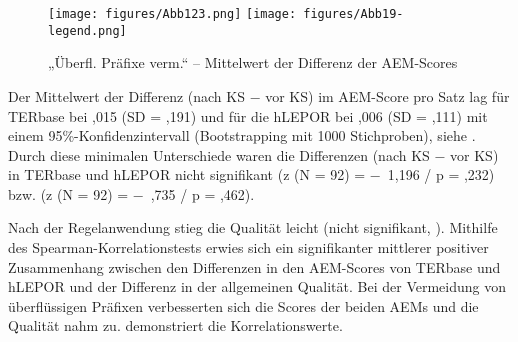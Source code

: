\begin{figure}






\texttt{[image: figures/Abb123.png]}
\texttt{[image: figures/Abb19-legend.png]}
\caption{\label{fig:05:123}„Überfl. Präfixe verm.“ -- Mittelwert der Differenz der AEM-Scores}
\end{figure}

Der Mittelwert der Differenz (nach KS $-$ vor KS) im AEM-Score pro Satz lag für TERbase bei ,015 (SD = ,191) und für die hLEPOR bei ,006 (SD = ,111) mit einem 95\%-Konfidenzintervall (Bootstrapping mit 1000 Stichproben), siehe . Durch diese minimalen Unterschiede waren die Differenzen (nach KS $-$ vor KS) in TERbase und hLEPOR nicht signifikant (z (N = 92) = $-$~1,196 / p = ,232) bzw. (z (N = 92) = $-$~,735 / p = ,462).


Nach der Regelanwendung stieg die Qualität leicht (nicht signifikant, ). Mithilfe des Spearman-Korrelationstests erwies sich ein signifikanter mittlerer positiver Zusammenhang zwischen den Differenzen in den AEM-Scores von TERbase und hLEPOR und der Differenz in der allgemeinen Qualität. Bei der Vermeidung von überflüssigen Präfixen verbesserten sich die Scores der beiden AEMs und die Qualität nahm zu.  demonstriert die Korrelationswerte.



